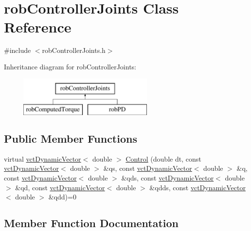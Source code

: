 \hypertarget{classrob_controller_joints}{}\section{rob\+Controller\+Joints Class Reference}
\label{classrob_controller_joints}


{\ttfamily \#include $<$rob\+Controller\+Joints.\+h$>$}

Inheritance diagram for rob\+Controller\+Joints\+:\begin{figure}[H]
\begin{center}
\leavevmode
\includegraphics[height=2.000000cm]{d6/df7/classrob_controller_joints}
\end{center}
\end{figure}
\subsection*{Public Member Functions}
\begin{DoxyCompactItemize}
\item 
virtual \hyperlink{classvct_dynamic_vector}{vct\+Dynamic\+Vector}$<$ double $>$ \hyperlink{classrob_controller_joints_a768d384eb9f3bdd173abe41708a97aff}{Control} (double dt, const \hyperlink{classvct_dynamic_vector}{vct\+Dynamic\+Vector}$<$ double $>$ \&qs, const \hyperlink{classvct_dynamic_vector}{vct\+Dynamic\+Vector}$<$ double $>$ \&q, const \hyperlink{classvct_dynamic_vector}{vct\+Dynamic\+Vector}$<$ double $>$ \&qds, const \hyperlink{classvct_dynamic_vector}{vct\+Dynamic\+Vector}$<$ double $>$ \&qd, const \hyperlink{classvct_dynamic_vector}{vct\+Dynamic\+Vector}$<$ double $>$ \&qdds, const \hyperlink{classvct_dynamic_vector}{vct\+Dynamic\+Vector}$<$ double $>$ \&qdd)=0
\end{DoxyCompactItemize}


\subsection{Member Function Documentation}
\hypertarget{classrob_controller_joints_a768d384eb9f3bdd173abe41708a97aff}{}

